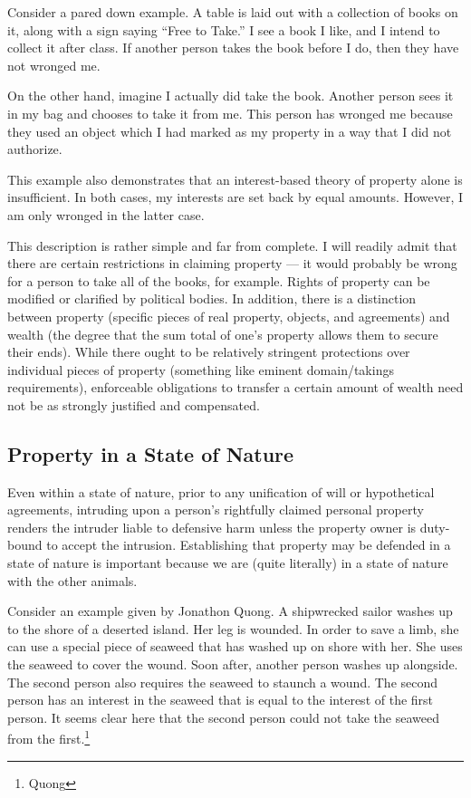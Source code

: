 	Consider a pared down example. A table is laid out with a collection of
	books on it, along with a sign saying “Free to Take.” I see a book I like,
	and I intend to collect it after class. If another person takes the book
	before I do, then they have not wronged me.

	On the other hand, imagine I actually did take the book. Another person
	sees it in my bag and chooses to take it from me. This person has wronged
	me because they used an object which I had marked as my property in a way
	that I did not authorize.

	This example also demonstrates that an interest-based theory of property
	alone is insufficient. In both cases, my interests are set back by equal
	amounts. However, I am only wronged in the latter case.

	This description is rather simple and far from complete. I will readily
	admit that there are certain restrictions in claiming property --- it would
	probably be wrong for a person to take all of the books, for example. Rights
	of property can be modified or clarified by political bodies. In addition,
	there is a distinction between property (specific pieces of real property,
	objects, and agreements) and wealth (the degree that the sum total of one’s
	property allows them to secure their ends). While there ought to be
	relatively stringent protections over individual pieces of property
	(something like eminent domain/takings requirements), enforceable
	obligations to transfer a certain amount of wealth need not be as strongly
	justified and compensated.

	\subsection{Property in a State of Nature}

	Even within a state of nature, prior to any unification of will or
	hypothetical agreements, intruding upon a person’s rightfully claimed
	personal property renders the intruder liable to defensive harm unless the
	property owner is duty-bound to accept the intrusion.  Establishing that
	property may be defended in a state of nature is important because we are
	(quite literally) in a state of nature with the other animals. 

	Consider an example given by Jonathon Quong.  A shipwrecked sailor washes
	up to the shore of a deserted island. Her leg is wounded. In order to save
	a limb, she can use a special piece of seaweed that has washed up on shore
	with her. She uses the seaweed to cover the wound. Soon after, another
	person washes up alongside. The second person also requires the seaweed to
	staunch a wound. The second person has an interest in the seaweed that is
	equal to the interest of the first person. It seems clear here that the
	second person could not take the seaweed from the first.\footnote{Quong}


